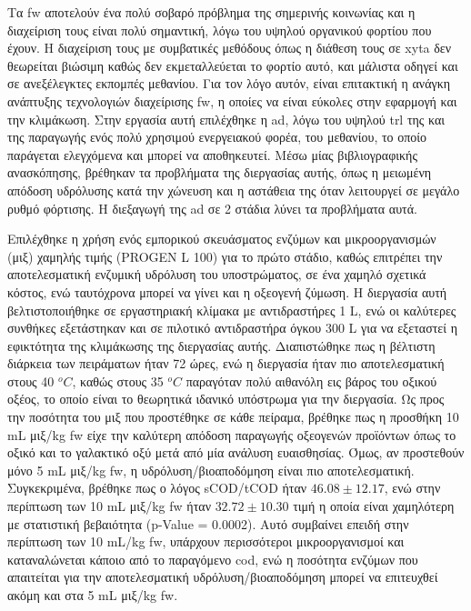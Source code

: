 \documentclass[11pt]{report}
\begin{document}
Τα \acrfull{fw} αποτελούν ένα πολύ σοβαρό πρόβλημα της σημερινής κοινωνίας και η διαχείριση τους είναι πολύ σημαντική, λόγω του υψηλού οργανικού φορτίου που έχουν. Η διαχείριση τους με συμβατικές μεθόδους όπως η διάθεση τους σε \acrshort{xyta} δεν θεωρείται βιώσιμη καθώς δεν εκμεταλλεύεται το φορτίο αυτό, και μάλιστα οδηγεί και σε ανεξέλεγκτες εκπομπές μεθανίου. Για τον λόγο αυτόν, είναι επιτακτική η ανάγκη ανάπτυξης τεχνολογιών διαχείρισης \acrshort{fw}, η οποίες να είναι εύκολες στην εφαρμογή και την κλιμάκωση. Στην εργασία αυτή επιλέχθηκε η \acrfull{ad}, λόγω του υψηλού \acrshort{trl} της και της παραγωγής ενός πολύ χρησιμού ενεργειακού φορέα, του μεθανίου, το οποίο παράγεται ελεγχόμενα και μπορεί να αποθηκευτεί. Μέσω μίας βιβλιογραφικής ανασκόπησης, βρέθηκαν τα προβλήματα της διεργασίας αυτής, όπως η μειωμένη απόδοση υδρόλυσης κατά την χώνευση και η αστάθεια της όταν λειτουργεί σε μεγάλο ρυθμό φόρτισης. Η διεξαγωγή της \acrshort{ad} σε 2 στάδια λύνει τα προβλήματα αυτά.

Επιλέχθηκε η χρήση ενός εμπορικού σκευάσματος ενζύμων και μικροοργανισμών (μιξ) χαμηλής τιμής (PROGEN L 100) για το πρώτο στάδιο, καθώς επιτρέπει την αποτελεσματική ενζυμική υδρόλυση του υποστρώματος, σε ένα χαμηλό σχετικά κόστος, ενώ ταυτόχρονα μπορεί να γίνει και η οξεογενή ζύμωση. Η διεργασία αυτή βελτιστοποιήθηκε σε εργαστηριακή κλίμακα με αντιδραστήρες 1 L, ενώ οι καλύτερες συνθήκες εξετάστηκαν και σε πιλοτικό αντιδραστήρα όγκου 300 L για να εξεταστεί η εφικτότητα της κλιμάκωσης της διεργασίας αυτής. Διαπιστώθηκε πως η βέλτιστη διάρκεια των πειράματων ήταν 72 ώρες, ενώ η διεργασία ήταν πιο αποτελεσματική στους 40 \(^oC\), καθώς στους 35 \(^oC\) παραγόταν πολύ αιθανόλη εις βάρος του οξικού οξέος, το οποίο είναι το θεωρητικά ιδανικό υπόστρωμα για την διεργασία. Ως προς την ποσότητα του μιξ που προστέθηκε σε κάθε πείραμα, βρέθηκε πως η προσθήκη 10 mL μιξ/kg \acrshort{fw} είχε την καλύτερη απόδοση παραγωγής οξεογενών προϊόντων όπως το οξικό και το γαλακτικό οξύ μετά από μία ανάλυση ευαισθησίας. Όμως, αν προστεθούν μόνο 5 mL μιξ/kg \acrshort{fw}, η υδρόλυση/βιοαποδόμηση είναι πιο αποτελεσματική. Συγκεκριμένα, βρέθηκε πως ο λόγος sCOD/tCOD ήταν \(46.08 \pm 12.17\), ενώ στην περίπτωση των 10 mL μιξ/kg \acrshort{fw} ήταν \(32.72 \pm 10.30\) τιμή η οποία είναι χαμηλότερη με στατιστική βεβαιότητα (p-Value = 0.0002). Αυτό συμβαίνει επειδή στην περίπτωση των 10 mL/kg \acrshort{fw}, υπάρχουν περισσότεροι μικροοργανισμοί και καταναλώνεται κάποιο από το παραγόμενο \acrshort{cod}, ενώ η ποσότητα ενζύμων που απαιτείται για την αποτελεσματική υδρόλυση/βιοαποδόμηση μπορεί να επιτευχθεί ακόμη και στα 5 mL μιξ/kg \acrshort{fw}.
\end{document}
